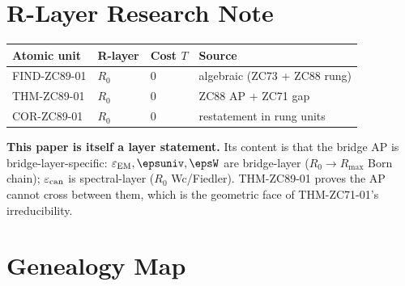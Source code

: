 \documentclass[12pt, a4paper]{article}
\renewcommand{\epsEM}{\varepsilon_{\rm EM}}     %
\renewcommand{\epscan}{\varepsilon_{\rm can}}   %
\begin{document}
\section{R-Layer Research Note}
\label{sec:rlayer-zc89}

\begin{layerbox}[title={R-Layer Assignments for ZC89}]
{\small\renewcommand{\arraystretch}{1.25}
\begin{center}
\begin{tabular}{@{}llll@{}}
\toprule
Atomic unit & R-layer & Cost $T$ & Source \\
\midrule
FIND-ZC89-01 & $R_0$ & $0$ & algebraic (ZC73 + ZC88 rung) \\
THM-ZC89-01 & $R_0$ & $0$ & ZC88 AP + ZC71 gap \\
COR-ZC89-01 & $R_0$ & $0$ & restatement in rung units \\
\bottomrule
\end{tabular}
\end{center}}

\textbf{This paper is itself a layer statement.} Its content is that the
bridge AP is bridge-layer-specific: $\epsEM,\epsuniv,\epsW$ are bridge-layer
($R_0\!\to\!R_{\max}$ Born chain); $\epscan$ is spectral-layer ($R_0$
Wc/Fiedler). THM-ZC89-01 proves the AP cannot cross between them, which is
the geometric face of THM-ZC71-01's irreducibility.
\end{layerbox}

\section{Genealogy Map}
\label{sec:genealogy-zc89}
\end{document}
